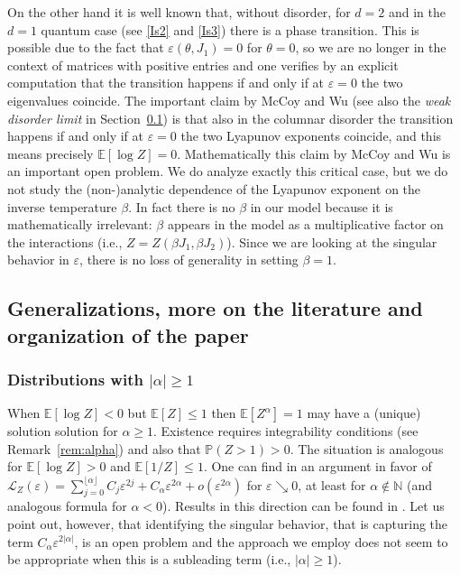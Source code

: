 \documentclass[reqno,11pt]{amsart}
\numberwithin{equation}{section}
\newcommand{\cL}{{\ensuremath{\mathcal L}} }
\newcommand{\bbE}{{\ensuremath{\mathbb E}} }
\newcommand{\bbN}{{\ensuremath{\mathbb N}} }
\newcommand{\bbP}{{\ensuremath{\mathbb P}} }
\newcommand{\ga}{\alpha}
\newcommand{\gb}{\beta}
\newcommand{\gep}{\varepsilon}       %
\begin{document}
 On the other hand  it is well known that, without disorder,  for $d=2$ and  in the $d=1$ quantum case (see \ref{Is2} and \ref{Is3})   there is a phase transition. This is possible due to the fact that $\gep(\theta, J_1)=0$ for $\theta=0$, %
 so we are no longer in the context of matrices with positive entries and one verifies by an explicit computation that the transition happens if and only if 
 at $\gep=0$ the two eigenvalues coincide. The important claim by McCoy and Wu  \cite{cf:MW,cf:MWbook} (see also the \emph{weak disorder limit} in Section~\ref{sec:overview}) is that 
 also in the columnar disorder the transition happens if and only if at $\gep=0$ the two Lyapunov exponents coincide, and this means precisely $\bbE[\log Z]=0$. Mathematically this claim by McCoy and Wu is an important open problem. We do analyze exactly this critical case, but we do not study  the (non-)analytic dependence of the Lyapunov exponent on the inverse temperature $\gb$. In fact there is no $\gb$ in our model because it is mathematically irrelevant: $\gb$ appears in the model as a multiplicative factor on the interactions (i.e., 
 $Z=Z(\gb J_1, \gb J_2)$). Since we are looking at the singular behavior in $\gep$, there is no loss of generality in setting $\gb=1$. 
 



\subsection{Generalizations, more on the literature and organization of the paper}
\label{sec:overview}

\subsubsection{Distributions with $|\alpha| \ge 1$}
When $\bbE[\log Z] < 0$  but $\bbE[Z] \le 1$ then  $\bbE[Z^\ga]=1$ may have a (unique) solution  solution for $ \ga \ge 1$. Existence 
requires integrability conditions (see Remark~\ref{rem:alpha}) and  also that  $\bbP(Z >1)>0$. The situation is analogous for 
$\bbE[\log Z] > 0$ and $\bbE[1/Z] \le 1$.
One can find in \cite{cf:DH} an argument  in favor of  $\cL_Z(\gep)= \sum_{j=0}^{\lfloor \ga  \rfloor} C_j \gep^{2j}+ C_\ga \gep^{2 \ga } +o( \gep^{2 \ga })$ for $\gep \searrow 0$, at least for $\ga  \not \in \bbN$ (and analogous formula for $\ga <0$).
 Results in this direction can be found in \cite{cf:benjamin}. 
 Let us point out, however, that identifying the singular behavior, that is capturing the term $C_\ga \gep^{2 \vert \ga \vert}$, is an open problem and the approach we employ does not seem to be appropriate when this is a subleading term (i.e., $\vert \ga \vert \ge 1$). 
\end{document}
